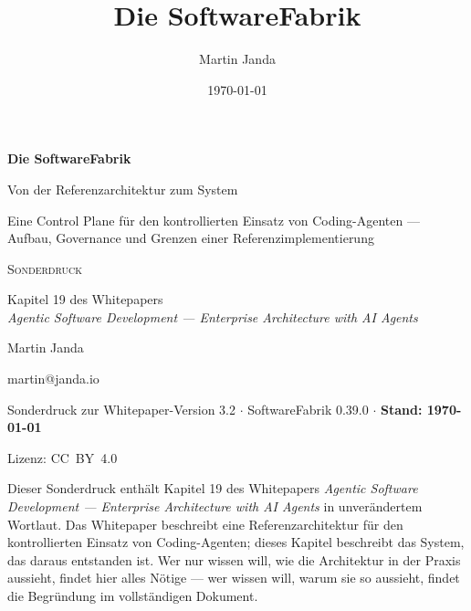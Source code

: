 \documentclass[11pt,a4paper,ngerman]{scrreprt}
\title{Die SoftwareFabrik}
\author{Martin Janda}
\date{\today}
\begin{document}
\begin{titlepage}
  \centering
  \vspace*{2.5cm}

  {\LARGE\bfseries Die SoftwareFabrik\par}
  \vspace{0.4cm}
  {\Large Von der Referenzarchitektur zum System\par}

  \vspace{0.8cm}
  {\large Eine Control Plane für den kontrollierten Einsatz von
  Coding-Agenten --- Aufbau, Governance und Grenzen einer
  Referenzimplementierung\par}

  \vspace{1.6cm}
  {\large\scshape Sonderdruck\par}
  \vspace{0.3cm}
  {\normalsize Kapitel 19 des Whitepapers\\
  \emph{Agentic Software Development --- Enterprise Architecture with AI
  Agents}\par}

  \vspace{1.4cm}
  {\large Martin Janda\par}
  \vspace{0.2cm}
  {\normalsize martin@janda.io\par}

  \vfill
  {\small Sonderdruck zur Whitepaper-Version 3.2 $\cdot$
  SoftwareFabrik 0.39.0 $\cdot$ \textbf{Stand: \today}\par}
  \vspace{0.4cm}
  {\small Lizenz: CC~BY~4.0\par}
  \vspace*{1.2cm}
\end{titlepage}

\tableofcontents


Dieser Sonderdruck enthält Kapitel 19 des Whitepapers \emph{Agentic
Software Development --- Enterprise Architecture with AI Agents} in
unverändertem Wortlaut. Das Whitepaper beschreibt eine Referenzarchitektur
für den kontrollierten Einsatz von Coding-Agenten; dieses Kapitel
beschreibt das System, das daraus entstanden ist. Wer nur wissen will, wie
die Architektur in der Praxis aussieht, findet hier alles Nötige --- wer
wissen will, warum sie so aussieht, findet die Begründung im vollständigen
Dokument.
\end{document}
